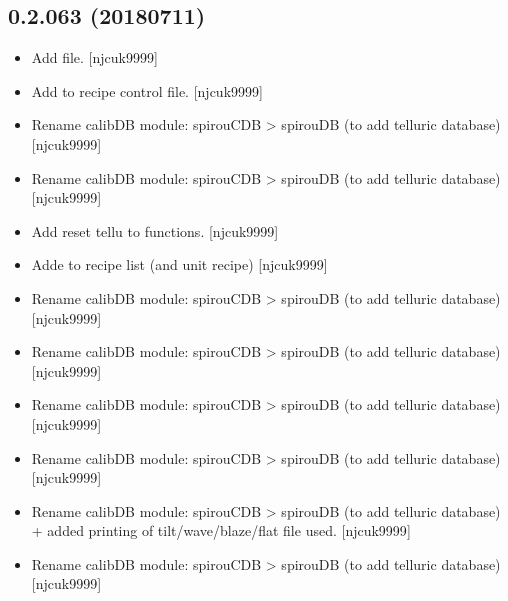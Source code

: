 \documentclass[a4paper,10pt,english]{report}
\begin{document}
\subsection{0.2.063 (2018\sphinxhyphen{}07\sphinxhyphen{}11)}
\label{\detokenize{misc/changelog:id415}}\begin{itemize}
\item {} 
Add  file. {[}njcuk9999{]}

\item {} 
Add  to recipe control file. {[}njcuk9999{]}

\item {} 
Rename calibDB module: spirouCDB \textendash{}\textgreater{} spirouDB (to add telluric
database) {[}njcuk9999{]}

\item {} 
Rename calibDB module: spirouCDB \textendash{}\textgreater{} spirouDB (to add telluric
database) {[}njcuk9999{]}

\item {} 
Add reset tellu to  functions. {[}njcuk9999{]}

\item {} 
Adde  to recipe list (and unit recipe) {[}njcuk9999{]}

\item {} 
Rename calibDB module: spirouCDB \textendash{}\textgreater{} spirouDB (to add telluric
database) {[}njcuk9999{]}

\item {} 
Rename calibDB module: spirouCDB \textendash{}\textgreater{} spirouDB (to add telluric
database) {[}njcuk9999{]}

\item {} 
Rename calibDB module: spirouCDB \textendash{}\textgreater{} spirouDB (to add telluric
database) {[}njcuk9999{]}

\item {} 
Rename calibDB module: spirouCDB \textendash{}\textgreater{} spirouDB (to add telluric
database) {[}njcuk9999{]}

\item {} 
Rename calibDB module: spirouCDB \textendash{}\textgreater{} spirouDB (to add telluric
database) + added printing of tilt/wave/blaze/flat file used.
{[}njcuk9999{]}

\item {} 
Rename calibDB module: spirouCDB \textendash{}\textgreater{} spirouDB (to add telluric
database) {[}njcuk9999{]}


\end{itemize}
\end{document}
